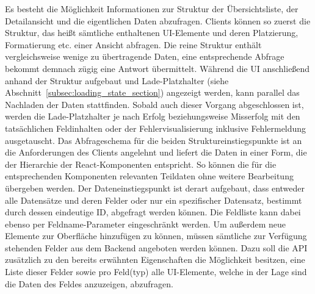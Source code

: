 Es besteht die Möglichkeit Informationen zur Struktur der Übersichtsliste, der Detailansicht und die eigentlichen Daten abzufragen. Clients können so zuerst die Struktur, das heißt sämtliche enthaltenen UI-Elemente und deren Platzierung, Formatierung etc. einer Ansicht abfragen. Die reine Struktur enthält vergleichsweise wenige zu übertragende Daten, eine entsprechende Abfrage bekommt demnach zügig eine Antwort übermittelt. Während die UI anschließend anhand der Struktur aufgebaut und Lade-Platzhalter (siehe Abschnitt~\ref{subsec:loading_state_section}) angezeigt werden, kann parallel das Nachladen der Daten stattfinden. Sobald auch dieser Vorgang abgeschlossen ist, werden die Lade-Platzhalter je nach Erfolg beziehungsweise Misserfolg mit den tatsächlichen Feldinhalten oder der Fehlervisualisierung inklusive Fehlermeldung ausgetauscht.
Das Abfrageschema für die beiden Struktureinstiegspunkte ist an die Anforderungen des Clients angelehnt und liefert die Daten in einer Form, die der Hierarchie der React-Komponenten entspricht. So können die für die entsprechenden Komponenten relevanten Teildaten ohne weitere Bearbeitung übergeben werden. Der Dateneinstiegspunkt ist derart aufgebaut, dass entweder alle Datensätze und deren Felder oder nur ein spezifischer Datensatz, bestimmt durch dessen eindeutige ID, abgefragt werden können. Die Feldliste kann dabei ebenso per Feldname-Parameter eingeschränkt werden.
Um außerdem neue Elemente zur Oberfläche hinzufügen zu können, müssen sämtliche zur Verfügung stehenden Felder aus dem Backend angeboten werden können. Dazu soll die API zusätzlich zu den bereits erwähnten Eigenschaften die Möglichkeit besitzen, eine Liste dieser Felder sowie pro Feld(typ) alle UI-Elemente, welche in der Lage sind die Daten des Feldes anzuzeigen, abzufragen.


